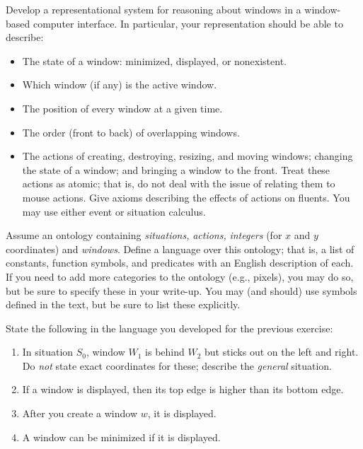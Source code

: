 \begin{exercise}
Develop a representational system for reasoning about windows in a 
window-based computer interface.  In particular, your representation should be
able to describe:
\begin{itemize}
\item The state of a window: minimized, displayed, or nonexistent.
\item Which window (if any) is the active window.
\item The position of every window at a given time.
\item The order (front to back) of overlapping windows.
\item The actions of creating, destroying, resizing, and moving windows;
changing the state of a window; and bringing a window to the front.
Treat these actions as atomic; that is, do not deal with the issue of relating
them to mouse actions. Give axioms describing the effects of actions on fluents.
You may use either event or situation calculus.
\end{itemize}
Assume an ontology containing {\em situations,} {\em actions,}
{\em integers}
(for $x$ and $y$ coordinates) and {\em windows}.  
Define a language
over this ontology; that is, a list of constants, function symbols, and
predicates with an English description of each.  If you need to add more 
categories to the ontology (e.g., pixels),
you may do so, but be sure to specify these in your write-up. You may 
(and should) use symbols defined in the text, but be sure to list these
explicitly.
\end{exercise} 

\begin{uexercise}
State the following in the language you developed for the previous exercise:
\begin{enumerate}
\item
In situation $S_0$,
window $W_1$ is behind $W_2$ but sticks out on the left and right.  Do {\em not\/} state exact coordinates for these;
describe the {\em general} situation.
\item
If a window is displayed, then its top edge is higher than its bottom edge.
\item
After you create a  window $w$, it is displayed.
\item
A window can be minimized if it is displayed.
\end{enumerate}
\end{uexercise} 

